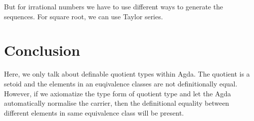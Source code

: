 \documentclass[a4paper,12pt]{article}
\begin{document}
But for irrational numbers we have to use different ways to generate the sequences. For square root, we can use Taylor series.

\section{Conclusion}
Here, we only talk about definable quotient types within Agda. The
quotient is a setoid and the elements in an euqivalence classes are
not definitionally equal. However, if we axiomatize the type form of
quotient type and let the Agda automatically normalise the carrier,
then the definitional equality between different elements in same
equivalence class will be present.


{}

\end{document}
